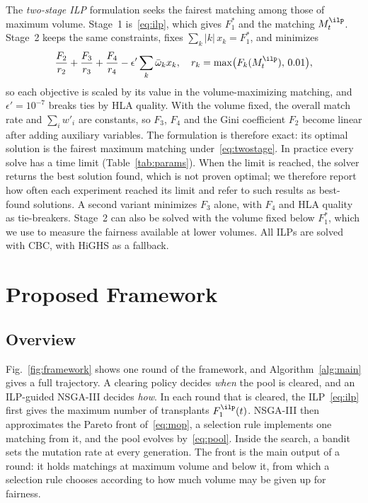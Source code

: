 \documentclass[journal]{IEEEtran}
\begin{document}
The \emph{two-stage ILP} formulation seeks the fairest matching among
those of maximum volume. Stage~1 is~\eqref{eq:ilp}, which gives $F_1^{*}$ and
the matching $M^{\ilp}_t$. Stage~2 keeps the same constraints, fixes
$\sum_k |k|\, x_k = F_1^{*}$, and minimizes
\begin{equation}
  \frac{F_2}{r_2} + \frac{F_3}{r_3} + \frac{F_4}{r_4}
  - \epsilon' \sum_k \bar\omega_k x_k ,
  \quad r_k = \max\bigl(F_k(M^{\ilp}_t),\, 0.01\bigr) ,
  \label{eq:twostage}
\end{equation}
so each objective is scaled by its value in the volume-maximizing
matching, and $\epsilon' = 10^{-7}$ breaks ties by HLA quality. With the
volume fixed, the overall match rate and $\sum_i w'_i$ are constants, so
$F_3$, $F_4$ and the Gini coefficient $F_2$ become linear after adding
auxiliary variables. The formulation is therefore exact: its optimal solution is
the fairest maximum matching under~\eqref{eq:twostage}. In practice every
solve has a time limit (Table~\ref{tab:params}). When the limit is reached,
the solver returns the best solution found, which is not proven optimal; we
therefore report how often each experiment reached its limit and refer to
such results as best-found solutions. A second variant minimizes
$F_3$ alone, with $F_4$ and HLA quality as tie-breakers. Stage~2 can
also be solved with the volume fixed below $F_1^{*}$, which we use to
measure the fairness available at lower volumes. All ILPs are solved
with CBC, with HiGHS as a fallback.

\section{Proposed Framework}
\label{sec:method}

\subsection{Overview}
\label{sec:method:overview}

Fig.~\ref{fig:framework} shows one round of the framework, and Algorithm~\ref{alg:main} gives a full trajectory. A clearing policy
decides \emph{when} the pool is cleared, and an ILP-guided NSGA-III
decides \emph{how}. In each round that is cleared, the ILP~\eqref{eq:ilp}
first gives the maximum number of transplants $F_1^{\ilp}(t)$. NSGA-III
then approximates the Pareto front of~\eqref{eq:mop}, a selection rule
implements one matching from it, and the pool evolves
by~\eqref{eq:pool}. Inside the search, a bandit sets the mutation rate
at every generation. The front is the main output of a round: it holds
matchings at maximum volume and below it, from which a selection rule
chooses according to how much volume may be given up for fairness.
\end{document}
